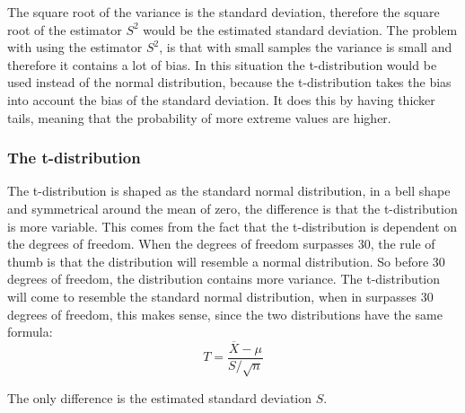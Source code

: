 The square root of the variance is the standard deviation, therefore the square root of the estimator $S^2$ would be the estimated standard deviation. The problem with using the estimator $S^2$, is that with small samples the variance is small and therefore it contains a lot of bias. In this situation the t-distribution would be used instead of the normal distribution, because the t-distribution takes the bias into account the bias of the standard deviation. It does this by having thicker tails, meaning that the probability of more extreme values are higher.

\subsubsection{The t-distribution}
The t-distribution is shaped as the standard normal distribution, in a bell shape and symmetrical around the mean of zero, the difference is that the t-distribution is more variable. This comes from the fact that the t-distribution is dependent on the degrees of freedom. When the degrees of freedom surpasses 30, the rule of thumb is that the distribution will resemble a normal distribution. So before 30 degrees of freedom, the distribution contains more variance.
The t-distribution will come to resemble the standard normal distribution, when in surpasses 30 degrees of freedom, this makes sense, since the two distributions have the same formula:
$$T=\frac{\overline{X}-\mu}{S/\sqrt{n}}$$

The only difference is the estimated standard deviation $S$.